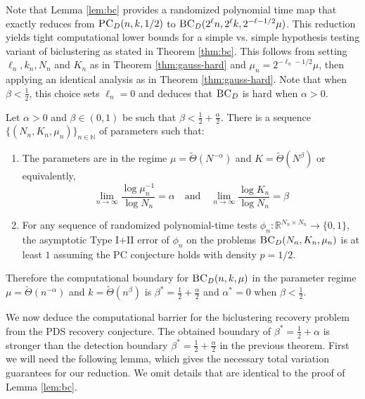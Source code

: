 Note that Lemma \ref{lem:bc} provides a randomized polynomial time map that exactly reduces from $\textsc{PC}_D(n, k, 1/2)$ to $\textsc{BC}_D(2^\ell n, 2^\ell k, 2^{-\ell-1/2} \mu)$. This reduction yields tight computational lower bounds for a simple vs. simple hypothesis testing variant of biclustering as stated in Theorem \ref{thm:bc}. This follows from setting $\ell_n, k_n, N_n$ and $K_n$ as in Theorem \ref{thm:gauss-hard} and $\mu_n = 2^{-\ell_n-1/2} \mu$, then applying an identical analysis as in Theorem \ref{thm:gauss-hard}. Note that when $\beta < \frac{1}{2}$, this choice sets $\ell_n = 0$ and deduces that $\textsc{BC}_D$ is hard when $\alpha > 0$.

\begin{theorem} \label{thm:bc}
Let $\alpha > 0$ and $\beta \in (0, 1)$ be such that $\beta < \frac{1}{2} + \frac{\alpha}{2}$. There is a sequence $\{ (N_n, K_n, \mu_n) \}_{n \in \mathbb{N}}$ of parameters such that:
\begin{enumerate}
\item The parameters are in the regime $\mu = \tilde{\Theta}(N^{-\alpha})$ and $K = \tilde{\Theta}(N^\beta)$ or equivalently,
$$\lim_{n \to \infty} \frac{\log \mu_n^{-1}}{\log N_n} = \alpha \quad \text{and} \quad \lim_{n \to \infty} \frac{\log K_n}{\log N_n} = \beta$$
\item For any sequence of randomized polynomial-time tests $\phi_n : \mathbb{R}^{N_n \times N_n} \to \{0, 1\}$, the asymptotic Type I$+$II error of $\phi_n$ on the problems $\textsc{BC}_D(N_n, K_n, \mu_n)$ is at least $1$ assuming the PC conjecture holds with density $p = 1/2$.
\end{enumerate}
Therefore the computational boundary for $\textsc{BC}_D(n, k, \mu)$ in the parameter regime $\mu = \tilde{\Theta}(n^{-\alpha})$ and $k = \tilde{\Theta}(n^\beta)$ is $\beta^* = \frac{1}{2} + \frac{\alpha}{2}$ and $\alpha^* = 0$ when $\beta < \frac{1}{2}$.
\end{theorem}

We now deduce the computational barrier for the biclustering recovery problem from the PDS recovery conjecture. The obtained boundary of $\beta^* = \frac{1}{2} + \alpha$ is stronger than the detection boundary $\beta^* = \frac{1}{2} + \frac{\alpha}{2}$ in the previous theorem. First we will need the following lemma, which gives the necessary total variation guarantees for our reduction. We omit details that are identical to the proof of Lemma \ref{lem:bc}.

